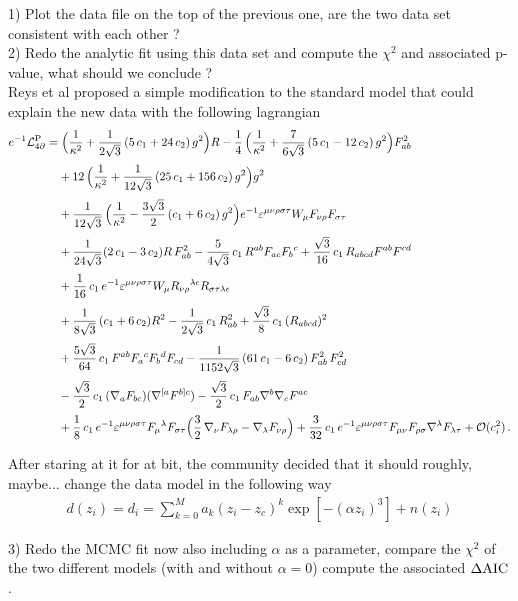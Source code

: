 \documentclass[a4paper]{article}
\def\ba{\begin{eqnarray}}
\def\ea{\end{eqnarray}}
\begin{document}
1) Plot the data file on the top of the previous one, are the two data set consistent with each other ? \\

2) Redo the analytic fit using this data set and compute the $\chi^{2}$ and associated p-value, what should we conclude ? \\

Reys et al proposed a simple modification to the standard model that could explain the new data with the following lagrangian
\begin{align}
\label{eq:L-corr}
e^{-1}\mathcal{L}_{4\partial}^{\mathrm{P}} =&\; \Bigl(\frac{1}{\kappa^2} + \frac{1}{2\sqrt{3}}\,(5\,c_1 + 24\,c_2)\,g^2\Bigr)R -\frac14\,\Bigl(\frac{1}{\kappa^2} + \frac{7}{6\sqrt{3}}\,(5\,c_1 - 12\,c_2)\,g^2\Bigr)F_{ab}^2 \nonumber \\[1mm]
&+ 12\,\Bigl(\frac{1}{\kappa^2} + \frac{1}{12\sqrt{3}}\,(25\,c_1 + 156\,c_2)\,g^2\Bigr)g^2 \nonumber \\[1mm] 
&+ \frac{1}{12\sqrt{3}}\,\Bigl(\frac{1}{\kappa^2} - \frac{3\sqrt{3}}{2}\,(c_1 + 6\,c_2)\,g^2\Bigr)e^{-1}\varepsilon^{\mu\nu\rho\sigma\tau}W_\mu F_{\nu\rho}F_{\sigma\tau}  \nonumber \\[1mm]
&+ \frac{1}{24\sqrt{3}}(2\,c_1 - 3\,c_2)R\,F_{ab}^2 - \frac{5}{4\sqrt{3}}\,c_1\,R^{ab}F_{ac}F_b{}^c + \frac{\sqrt{3}}{16}\,c_1\,R_{abcd}F^{ab}F^{cd} \nonumber \\[1mm]
&+ \frac{1}{16}\,c_1\,e^{-1}\varepsilon^{\mu\nu\rho\sigma\tau}W_\mu R_{\nu\rho}{}^{\lambda\epsilon}R_{\sigma\tau\lambda\epsilon} \nonumber \\[1mm]
&+ \frac{1}{8\sqrt{3}}\,(c_1 + 6\,c_2)R^2 - \frac{1}{2\sqrt{3}}\,c_1\,R_{ab}^2 + \frac{\sqrt{3}}{8}\,c_1\,(R_{abcd})^2 \\[1mm]
&+ \frac{5\sqrt{3}}{64}\,c_1\,F^{ab}F_{a}{}^cF_b{}^d F_{cd} - \frac{1}{1152\sqrt{3}}\,(61\,c_1 - 6\,c_2)\,F_{ab}^2\,F_{cd}^2 \nonumber \\[1mm] 
& - \frac{\sqrt{3}}{2}\,c_1\,(\nabla_a F_{bc})(\nabla^{[a}F^{b]c}) - \frac{\sqrt{3}}{2}\,c_1\,F_{ab}\nabla^b\nabla_c F^{ac} \nonumber \\[1mm] 
&+ \frac{1}{8}\,c_1\,e^{-1}\varepsilon^{\mu\nu\rho\sigma\tau} F_\mu{}^\lambda F_{\sigma\tau}\Bigl(\frac32\,\nabla_\nu F_{\lambda\rho} - \nabla_\lambda F_{\nu\rho}\Bigr) + \frac{3}{32}\,c_1\,e^{-1}\varepsilon^{\mu\nu\rho\sigma\tau} F_{\mu\nu}F_{\rho\sigma}\nabla^\lambda F_{\lambda\tau} + \mathcal{O}(c_i^2) \, . \nonumber
\end{align}

After staring at it for at bit, the community decided that it should roughly, maybe... change  the data model in the following way
\ba
d(z_{i}) = d_{i} =  \sum_{k=0}^{M} a_{k}(z_{i}-z_{c})^{k} \exp[-(\alpha z_{i})^{3}] + n(z_{i})
\ea

3) Redo the MCMC fit now also including $\alpha$ as a parameter, compare the $\chi^{2}$ of the two different models (with and without $\alpha=0$) compute the associated $\Delta \rm AIC$.
\end{document}
